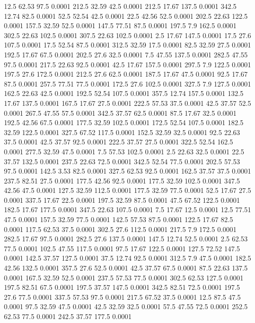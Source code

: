 12.5	62.53	97.5	0.0001
212.5	32.59	42.5	0.0001
212.5	17.67	137.5	0.0001
342.5	12.74	82.5	0.0001
52.5	52.54	42.5	0.0001
22.5	42.56	52.5	0.0001
202.5	22.63	122.5	0.0001
157.5	32.59	52.5	0.0001
147.5	77.51	87.5	0.0001
197.5	7.9	162.5	0.0001
302.5	22.63	102.5	0.0001
307.5	22.63	102.5	0.0001
2.5	17.67	147.5	0.0001
17.5	27.6	107.5	0.0001
17.5	52.54	87.5	0.0001
312.5	32.59	17.5	0.0001
82.5	32.59	27.5	0.0001
192.5	17.67	67.5	0.0001
202.5	27.6	32.5	0.0001
7.5	47.55	137.5	0.0001
282.5	47.55	97.5	0.0001
217.5	22.63	92.5	0.0001
42.5	17.67	157.5	0.0001
297.5	7.9	122.5	0.0001
197.5	27.6	172.5	0.0001
212.5	27.6	62.5	0.0001
187.5	17.67	47.5	0.0001
92.5	17.67	87.5	0.0001
257.5	77.51	77.5	0.0001
172.5	27.6	102.5	0.0001
327.5	7.9	127.5	0.0001
162.5	22.63	42.5	0.0001
192.5	52.54	107.5	0.0001
357.5	12.74	157.5	0.0001
132.5	17.67	137.5	0.0001
167.5	17.67	27.5	0.0001
222.5	57.53	37.5	0.0001
42.5	37.57	52.5	0.0001
267.5	47.55	57.5	0.0001
342.5	37.57	62.5	0.0001
87.5	17.67	32.5	0.0001
192.5	42.56	67.5	0.0001
177.5	32.59	102.5	0.0001
172.5	52.54	107.5	0.0001
182.5	32.59	122.5	0.0001
327.5	67.52	117.5	0.0001
152.5	32.59	32.5	0.0001
92.5	22.63	37.5	0.0001
42.5	37.57	92.5	0.0001
222.5	37.57	27.5	0.0001
322.5	52.54	162.5	0.0001
277.5	32.59	47.5	0.0001
7.5	57.53	102.5	0.0001
2.5	22.63	32.5	0.0001
22.5	37.57	132.5	0.0001
237.5	22.63	72.5	0.0001
342.5	52.54	77.5	0.0001
202.5	57.53	97.5	0.0001
142.5	3.53	82.5	0.0001
327.5	62.53	92.5	0.0001
162.5	37.57	37.5	0.0001
237.5	82.51	27.5	0.0001
177.5	42.56	92.5	0.0001
177.5	32.59	102.5	0.0001
347.5	42.56	47.5	0.0001
127.5	32.59	112.5	0.0001
177.5	32.59	77.5	0.0001
52.5	17.67	27.5	0.0001
337.5	17.67	22.5	0.0001
197.5	32.59	87.5	0.0001
47.5	67.52	122.5	0.0001
182.5	17.67	177.5	0.0001
347.5	22.63	107.5	0.0001
7.5	17.67	12.5	0.0001
12.5	77.51	47.5	0.0001
157.5	32.59	77.5	0.0001
142.5	57.53	87.5	0.0001
122.5	17.67	82.5	0.0001
117.5	62.53	37.5	0.0001
302.5	27.6	112.5	0.0001
217.5	7.9	172.5	0.0001
282.5	17.67	97.5	0.0001
282.5	27.6	137.5	0.0001
147.5	12.74	52.5	0.0001
2.5	62.53	77.5	0.0001
102.5	47.55	117.5	0.0001
97.5	17.67	122.5	0.0001
127.5	72.52	147.5	0.0001
142.5	37.57	127.5	0.0001
37.5	12.74	92.5	0.0001
312.5	7.9	47.5	0.0001
182.5	42.56	132.5	0.0001
357.5	27.6	52.5	0.0001
42.5	37.57	67.5	0.0001
87.5	22.63	137.5	0.0001
167.5	32.59	52.5	0.0001
237.5	57.53	77.5	0.0001
302.5	62.53	127.5	0.0001
197.5	82.51	67.5	0.0001
197.5	37.57	147.5	0.0001
342.5	82.51	72.5	0.0001
197.5	27.6	77.5	0.0001
337.5	57.53	97.5	0.0001
217.5	67.52	37.5	0.0001
12.5	87.5	47.5	0.0001
97.5	32.59	47.5	0.0001
42.5	32.59	32.5	0.0001
57.5	47.55	72.5	0.0001
252.5	62.53	77.5	0.0001
242.5	37.57	177.5	0.0001

